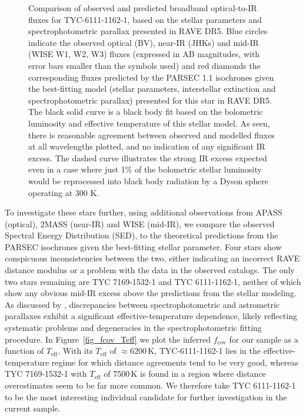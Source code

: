 \documentclass[twocolumn]{aastex6}
\begin{document}
\begin{figure}[t]
\caption{Comparison of observed and predicted broadband optical-to-IR fluxes for TYC-6111-1162-1, based on the stellar parameters and spectrophotometric parallax presented in RAVE DR5. Blue circles indicate the observed optical (BV), near-IR (JHKs) and mid-IR (WISE W1, W2, W3) fluxes (expressed in AB magnitudes, with error bars smaller than the symbols used) and red diamonds the corresponding fluxes predicted by the PARSEC 1.1 isochrones given the best-fitting model (stellar parameters, interstellar extinction and spectrophotometric parallax) presented for this star in RAVE DR5. The black solid curve is a black body fit based on the bolometric luminosity and effective temperature of this stellar model. As seen, there is reasonable agreement between observed and modelled fluxes at all wavelengths plotted, and no indication of any significant IR excess. The dashed curve illustrates the strong IR excess expected even in a case where just 1\% of the bolometric stellar luminosity would be reprocessed into black body radiation by a Dyson sphere operating at 300 K.}
\label{SED_fig}
\end{figure}

To investigate these stars further, using additional observations from APASS (optical), 2MASS (near-IR) and WISE (mid-IR), we compare the observed Spectral Energy Distribution (SED), to the theoretical predictions from the PARSEC isochrones given the best-fitting stellar parameter. Four stars show conspicuous inconsistencies between the two, either indicating an incorrect RAVE distance modulus or a problem with the data in the observed catalogs. The only two stars remaining are TYC 7169-1532-1 and TYC 6111-1162-1, neither of which show any obvious mid-IR excess above the predictions from the stellar modeling. As discussed by \citet{McMillan17}, discrepancies between spectrophotometric and astrometric parallaxes exhibit a significant effective-temperature dependence, likely reflecting systematic problems and degeneracies in the spectrophotometric fitting procedure. In Figure~\ref{fig_fcov_Teff} we plot the inferred $f_\mathrm{cov}$ for our sample as a function of $T_\mathrm{eff}$. With its $T_\mathrm{eff}$ of $\approx$6200\,K, TYC-6111-1162-1 lies in the effective-temperature regime for which distance agreements tend to be very good, whereas TYC 7169-1532-1 with $T_\mathrm{eff}$ of 7500\,K is found in a region where distance overestimates seem to be far more common. We therefore take TYC 6111-1162-1 to be the most interesting individual candidate for further investigation in the current sample. 
\end{document}
